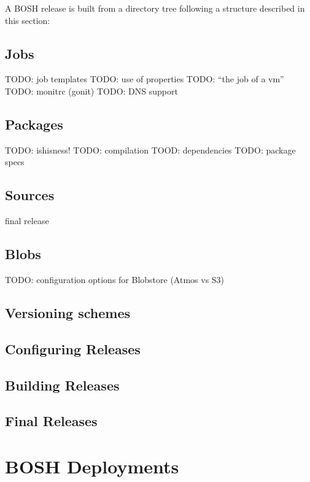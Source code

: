 A BOSH release is built from a directory tree following a structure
described in this section:

\section{Jobs}
\label{jobs}

TODO: job templates
TODO: use of properties
TODO: ``the job of a vm''
TODO: monitrc (gonit)
TODO: DNS support

\section{Packages}
\label{packages}

TODO: ishisness!
TODO: compilation
TOOD: dependencies
TODO: package specs

\section{Sources}
\label{sources}

final release

\section{Blobs}
\label{blobs}

TODO: configuration options for Blobstore (Atmos vs S3)

\section{Versioning schemes}
\label{versioningschemes}

\section{Configuring Releases}
\label{configuringreleases}

\section{Building Releases}
\label{buildingreleases}

\section{Final Releases}
\label{finalreleases}

\chapter{BOSH Deployments}
\label{boshdeployments}

